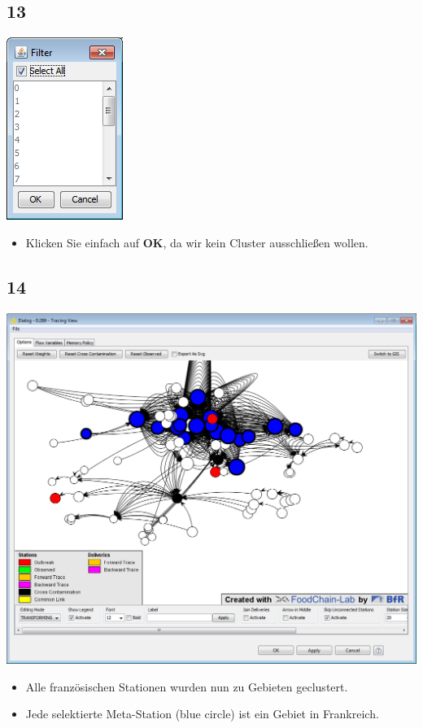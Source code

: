 \documentclass{beamer}
\begin{document}
\subsection{13}
\begin{frame}
	\begin{center}
  		\includegraphics[height=0.5\textheight]{13.png}
	\end{center}
	\begin{itemize}
		\item Klicken Sie einfach auf \textbf{OK}, da wir kein Cluster ausschließen wollen.
	\end{itemize}
\end{frame}

\subsection{14}
\begin{frame}
	\begin{center}
  		\includegraphics[height=0.6\textheight]{14.png}
	\end{center}
	\begin{itemize}
		\item Alle französischen Stationen wurden nun zu Gebieten geclustert.
		\item Jede selektierte Meta-Station (blue circle) ist ein Gebiet in Frankreich.		
	\end{itemize}
\end{frame}
\end{document}
